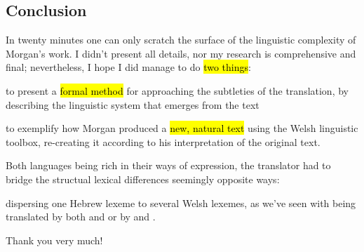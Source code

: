 \begin{paper}
	\section{Conclusion}

	In twenty minutes one can only scratch the surface of the linguistic complexity of Morgan’s work. I didn’t present all details, nor my research is comprehensive and final; nevertheless, I hope I did manage to do \hl{two things}:
	\begin{compactitem}
		\item to present a \hl{formal method} for approaching the subtleties of the translation, by describing the linguistic system that emerges from the text
		\item to exemplify how Morgan produced a \hl{new, natural text} using the Welsh linguistic toolbox, re-creating it according to his interpretation of the original text.
	\end{compactitem}

	Both languages being rich in their ways of expression, the translator had to bridge the structual lexical differences seemingly opposite ways:
	\begin{compactitem}
	\item dispersing one Hebrew lexeme to several Welsh lexemes, as we’ve seen with  being translated by both  and  or  by  and .\tounfold{***}
	\end{compactitem}

	Thank you very much!
\end{paper}
